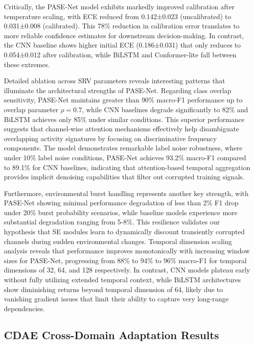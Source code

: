 \documentclass[journal]{IEEEtran}
\begin{document}
Critically, the PASE-Net model exhibits markedly improved calibration after temperature scaling, with ECE reduced from 0.142±0.023 (uncalibrated) to 0.031±0.008 (calibrated). This 78\% reduction in calibration error translates to more reliable confidence estimates for downstream decision-making. In contrast, the CNN baseline shows higher initial ECE (0.186±0.031) that only reduces to 0.054±0.012 after calibration, while BiLSTM and Conformer-lite fall between these extremes.

Detailed ablation across SRV parameters reveals interesting patterns that illuminate the architectural strengths of PASE-Net. Regarding class overlap sensitivity, PASE-Net maintains greater than 90\% macro-F1 performance up to overlap parameter $\rho=0.7$, while CNN baselines degrade significantly to 82\% and BiLSTM achieves only 85\% under similar conditions. This superior performance suggests that channel-wise attention mechanisms effectively help disambiguate overlapping activity signatures by focusing on discriminative frequency components. The model demonstrates remarkable label noise robustness, where under 10\% label noise conditions, PASE-Net achieves 93.2\% macro-F1 compared to 89.1\% for CNN baselines, indicating that attention-based temporal aggregation provides implicit denoising capabilities that filter out corrupted training signals.

Furthermore, environmental burst handling represents another key strength, with PASE-Net showing minimal performance degradation of less than 2\% F1 drop under 20\% burst probability scenarios, while baseline models experience more substantial degradation ranging from 5-8\%. This resilience validates our hypothesis that SE modules learn to dynamically discount transiently corrupted channels during sudden environmental changes. Temporal dimension scaling analysis reveals that performance improves monotonically with increasing window sizes for PASE-Net, progressing from 88\% to 94\% to 96\% macro-F1 for temporal dimensions of 32, 64, and 128 respectively. In contrast, CNN models plateau early without fully utilizing extended temporal context, while BiLSTM architectures show diminishing returns beyond temporal dimension of 64, likely due to vanishing gradient issues that limit their ability to capture very long-range dependencies.

\subsection{CDAE Cross-Domain Adaptation Results}
\end{document}

